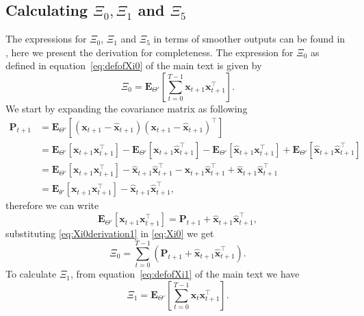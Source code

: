 \documentclass[]{article}
\begin{document}
\subsection*{Calculating $\Xi_{0}, \Xi_{1}$ and $\Xi_5$}
The expressions for $\Xi_0$, $\Xi_1$ and $\Xi_{5}$ in terms of smoother outputs can be found in \cite{Shumway2000}, here we present the derivation for completeness.
The expression for  $\Xi_{0}$ as defined in equation~\ref{eq:defofXi0} of the main text is given by
\begin{equation}\label{eq:Xi0}
 \Xi_0=\mathbf E_{\Theta'}\left[\sum_{t=0}^{T-1}\mathbf x_{t+1}\mathbf x_{t+1}^\top\right].
\end{equation}
We start by expanding the covariance matrix as following
\begin{align}
 \mathbf P_{t+1}&=\mathbf E_{\Theta'}\left[(\mathbf x_{t+1}-\mathbf{\hat x}_{t+1})(\mathbf x_{t+1}-\mathbf{\hat x}_{t+1})^\top\right] \nonumber \\
&=\mathbf E_{\Theta'}\left[\mathbf x_{t+1}\mathbf x_{t+1}^\top\right]-\mathbf E_{\Theta'}\left[\mathbf x_{t+1}\mathbf{\hat x}_{t+1}^\top\right]-\mathbf E_{\Theta'}\left[\mathbf{\hat x}_{t+1}\mathbf x_{t+1}^\top\right]+\mathbf E_{\Theta'}\left[\mathbf{\hat x}_{t+1}\mathbf{\hat x}_{t+1}^\top\right] \nonumber \\
&=\mathbf E_{\Theta'}\left[\mathbf x_{t+1}\mathbf x_{t+1}^\top\right]-\mathbf {\hat x}_{t+1}\mathbf{\hat x}_{t+1}^\top-\mathbf {\hat x}_{t+1}\mathbf{\hat x}_{t+1}^\top+\mathbf {\hat x}_{t+1}\mathbf{\hat x}_{t+1}^\top \nonumber \\
&=\mathbf E_{\theta'}\left[\mathbf x_{t+1}\mathbf x_{t+1}^\top\right]-\mathbf {\hat x}_{t+1}\mathbf{\hat x}_{t+1}^\top,
\end{align}
therefore we can write
\begin{equation}\label{eq:Xi0derivation1}
 \mathbf E_{\Theta'}\left[\mathbf x_{t+1}\mathbf x_{t+1}^\top\right]=\mathbf P_{t+1}+\mathbf {\hat x}_{t+1}\mathbf{\hat x}_{t+1}^\top,
\end{equation}
substituting \ref{eq:Xi0derivation1} in \ref{eq:Xi0} we get
\begin{equation}
 \Xi_0=\sum_{t=0}^{T-1}\left(\mathbf P_{t+1}+\mathbf{\hat x}_{t+1}\mathbf{\hat x}_{t+1}^\top\right).
\end{equation}
To calculate $\Xi_1$, from equation~\ref{eq:defofXi1} of the main text we have
\begin{equation}\label{eq:Xi1}
 \Xi_1=\mathbf E_{\Theta'}\left[\sum_{t=0}^{T-1}\mathbf x_t\mathbf x_{t+1}^\top\right].
\end{equation}
\end{document}
